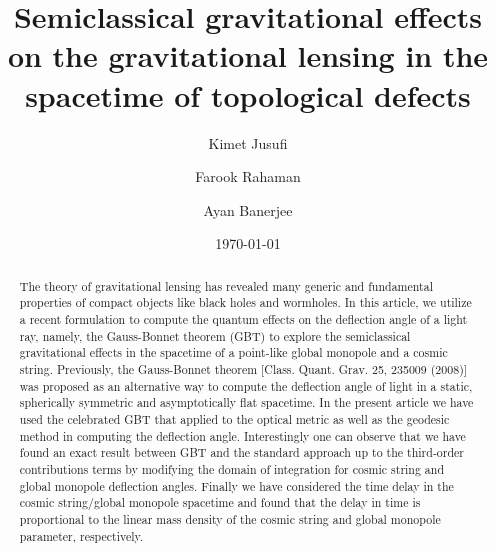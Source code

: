 \documentclass[preprint,superscriptaddress,amsfonts,amssymb,amsmath,showpacs]{revtex4}
\begin{document}
\title{Semiclassical gravitational effects  on the gravitational lensing in the spacetime of topological defects}
\author{Kimet Jusufi}

\author{Farook Rahaman}

\author{Ayan Banerjee}
\date{\today }

\begin{abstract}
The theory of gravitational lensing has revealed many generic and fundamental properties of compact objects like black holes and wormholes. In this article, we utilize a recent formulation to compute the quantum effects on the deflection angle of a light ray, namely, the Gauss-Bonnet theorem (GBT) to explore the semiclassical gravitational effects in the spacetime of a point-like global monopole and a cosmic string. Previously, the Gauss-Bonnet theorem [Class. Quant. Grav. 25, 235009 (2008)] was proposed as an alternative way to compute the deflection angle of light in a static, spherically symmetric and asymptotically flat spacetime. In the present article we have used the celebrated GBT that applied to the optical metric as well as the geodesic method in computing the deflection angle. Interestingly one can  observe that we have found an exact result between GBT and the standard approach up to the third-order contributions terms by modifying the domain of integration for cosmic string and global monopole deflection angles. Finally we have considered the time delay in the cosmic string/global monopole spacetime and found that the delay in time is proportional to the linear mass density of the  cosmic string and global monopole parameter, respectively.
\end{abstract}

\maketitle
\end{document}
